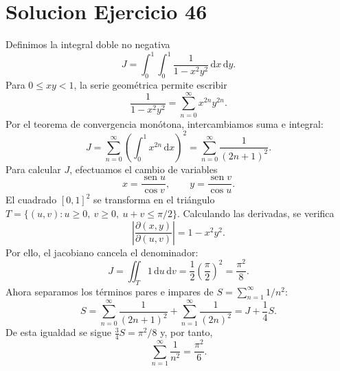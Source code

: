 \documentclass[11pt,a4paper]{article}
\DeclareMathOperator{\sen}{sen}
\newcommand{\dd}{\,\mathrm{d}}
\begin{document}
\section{Solucion Ejercicio 46}
Definimos la integral doble no negativa
\[J=\int_0^1\int_0^1\frac{1}{1-x^2y^2}\dd x\dd y.\]
Para $0\le xy<1$, la serie geométrica permite escribir
\[\frac1{1-x^2y^2}=\sum_{n=0}^\infty x^{2n}y^{2n}.\]
Por el teorema de convergencia monótona, intercambiamos suma e integral:
\[J=\sum_{n=0}^\infty\left(\int_0^1x^{2n}\dd x\right)^2=\sum_{n=0}^\infty\frac1{(2n+1)^2}.\]
Para calcular $J$, efectuamos el cambio de variables
\[x=\frac{\sen u}{\cos v},\qquad y=\frac{\sen v}{\cos u}.\]
El cuadrado $[0,1]^2$ se transforma en el triángulo $T=\{(u,v):u\ge0,\ v\ge0,\ u+v\le\pi/2\}$. Calculando las derivadas, se verifica
\[\left|\frac{\partial(x,y)}{\partial(u,v)}\right|=1-x^2y^2.\]
Por ello, el jacobiano cancela el denominador:
\[J=\iint_T1\dd u\dd v=\frac12\left(\frac\pi2\right)^2=\frac{\pi^2}{8}.\]
Ahora separamos los términos pares e impares de $S=\sum_{n=1}^\infty1/n^2$:
\[S=\sum_{n=0}^\infty\frac1{(2n+1)^2}+\sum_{n=1}^\infty\frac1{(2n)^2}=J+\frac14 S.\]
De esta igualdad se sigue $\frac34S=\pi^2/8$ y, por tanto,
\[\boxed{\displaystyle\sum_{n=1}^\infty\frac1{n^2}=\frac{\pi^2}{6}}.\]
\end{document}
